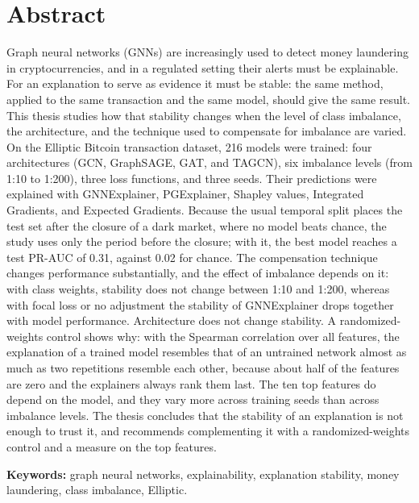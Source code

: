 \chapter*{Abstract}

Graph neural networks (GNNs) are increasingly used to detect money laundering in
cryptocurrencies, and in a regulated setting their alerts must be explainable. For an
explanation to serve as evidence it must be stable: the same method, applied to the same
transaction and the same model, should give the same result. This thesis studies how that
stability changes when the level of class imbalance, the architecture, and the technique used to
compensate for imbalance are varied. On the Elliptic Bitcoin transaction dataset, 216 models
were trained: four architectures (GCN, GraphSAGE, GAT, and TAGCN), six imbalance levels (from
1:10 to 1:200), three loss functions, and three seeds. Their predictions were explained with
GNNExplainer, PGExplainer, Shapley values, Integrated Gradients, and Expected Gradients. Because
the usual temporal split places the test set after the closure of a dark market, where no model
beats chance, the study uses only the period before the closure; with it, the best model
reaches a test PR-AUC of 0.31, against 0.02 for chance. The compensation technique changes
performance substantially, and the effect of imbalance depends on it: with class weights,
stability does not change between 1:10 and 1:200, whereas with focal loss or no adjustment the
stability of GNNExplainer drops together with model performance. Architecture does not change
stability. A randomized-weights control shows why: with the
Spearman correlation over all features, the explanation of a trained model resembles that of an
untrained network almost as much as two repetitions resemble each other, because about half of
the features are zero and the explainers always rank them last. The ten top features do depend
on the model, and they vary more across training seeds than across imbalance levels. The thesis
concludes that the stability of an explanation is not enough to trust it, and recommends
complementing it with a randomized-weights control and a measure on the top features.

\vspace{0.4cm}
\noindent\textbf{Keywords:} graph neural networks, explainability, explanation stability,
money laundering, class imbalance, Elliptic.
